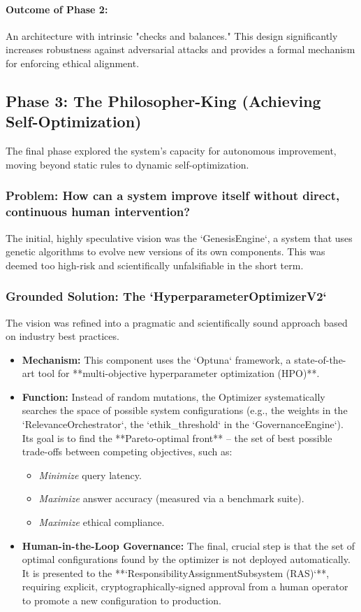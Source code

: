 \documentclass[11pt, a4paper]{article}
\begin{document}
\paragraph{Outcome of Phase 2:} An architecture with intrinsic "checks and balances." This design significantly increases robustness against adversarial attacks and provides a formal mechanism for enforcing ethical alignment.

\subsection{Phase 3: The Philosopher-King (Achieving Self-Optimization)}
\label{subsec:philosopherking}

The final phase explored the system's capacity for autonomous improvement, moving beyond static rules to dynamic self-optimization.

\subsubsection{Problem: How can a system improve itself without direct, continuous human intervention?}
The initial, highly speculative vision was the `GenesisEngine`, a system that uses genetic algorithms to evolve new versions of its own components. This was deemed too high-risk and scientifically unfalsifiable in the short term.

\subsubsection{Grounded Solution: The `HyperparameterOptimizerV2`}
The vision was refined into a pragmatic and scientifically sound approach based on industry best practices.
\begin{itemize}
    \item \textbf{Mechanism:} This component uses the `Optuna` framework, a state-of-the-art tool for **multi-objective hyperparameter optimization (HPO)**.
    \item \textbf{Function:} Instead of random mutations, the Optimizer systematically searches the space of possible system configurations (e.g., the weights in the `RelevanceOrchestrator`, the `ethik_threshold` in the `GovernanceEngine`). Its goal is to find the **Pareto-optimal front** – the set of best possible trade-offs between competing objectives, such as:
        \begin{itemize}
            \item \textit{Minimize} query latency.
            \item \textit{Maximize} answer accuracy (measured via a benchmark suite).
            \item \textit{Maximize} ethical compliance.
        \end{itemize}
    \item \textbf{Human-in-the-Loop Governance:} The final, crucial step is that the set of optimal configurations found by the optimizer is not deployed automatically. It is presented to the **`ResponsibilityAssignmentSubsystem (RAS)`**, requiring explicit, cryptographically-signed approval from a human operator to promote a new configuration to production.
\end{itemize}
\end{document}
